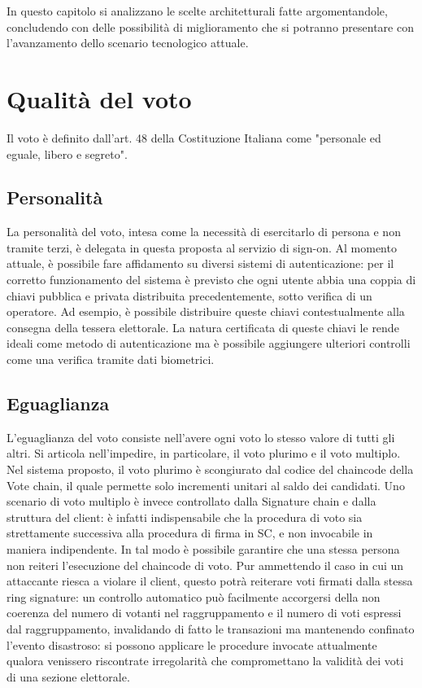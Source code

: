 In questo capitolo si analizzano le scelte architetturali fatte argomentandole, concludendo con delle possibilità di miglioramento che si potranno presentare con l'avanzamento dello scenario tecnologico attuale.

\section{Qualità del voto}
	Il voto è definito dall'art. 48 \cite{art48} della Costituzione Italiana come "personale ed eguale, libero e segreto".
	\subsection{Personalità}\label{subsec:personalita_voto}
		La personalità del voto, intesa come la necessità di esercitarlo di persona e non tramite terzi, è delegata in questa proposta al servizio di sign-on. Al momento attuale, è possibile fare affidamento su diversi sistemi di autenticazione: per il corretto funzionamento del sistema è previsto che ogni utente abbia una coppia di chiavi pubblica e privata distribuita precedentemente, sotto verifica di un operatore. Ad esempio, è possibile distribuire queste chiavi contestualmente alla consegna della tessera elettorale. La natura certificata di queste chiavi le rende ideali come metodo di autenticazione ma è possibile aggiungere ulteriori controlli come una verifica tramite dati biometrici.

	\subsection{Eguaglianza}
		L'eguaglianza del voto consiste nell'avere ogni voto lo stesso valore di tutti gli altri. Si articola nell'impedire, in particolare, il voto plurimo e il voto multiplo. Nel sistema proposto, il voto plurimo è scongiurato dal codice del chaincode della Vote chain, il quale permette solo incrementi unitari al saldo dei candidati. Uno scenario di voto multiplo è invece controllato dalla Signature chain e dalla struttura del client: è infatti indispensabile che la procedura di voto sia strettamente successiva alla procedura di firma in SC, e non invocabile in maniera indipendente. In tal modo è possibile garantire che una stessa persona non reiteri l'esecuzione del chaincode di voto. Pur ammettendo il caso in cui un attaccante riesca a violare il client, questo potrà reiterare voti firmati dalla stessa ring signature: un controllo automatico può facilmente accorgersi della non coerenza del numero di votanti nel raggruppamento e il numero di voti espressi dal raggruppamento, invalidando di fatto le transazioni ma mantenendo confinato l'evento disastroso: si possono applicare le procedure invocate attualmente qualora venissero riscontrate irregolarità che compromettano la validità dei voti di una sezione elettorale.

